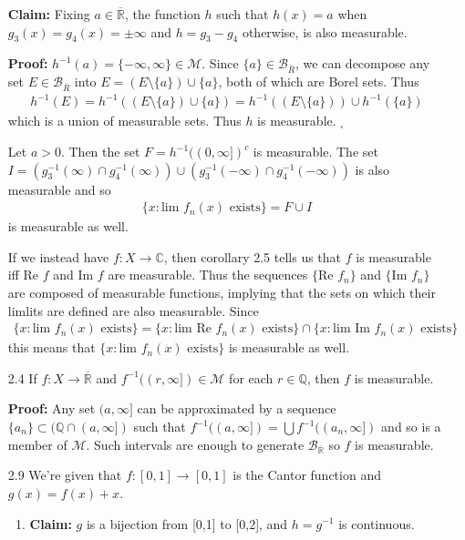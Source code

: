 \documentclass[11pt,letter]{article}
\begin{document}
\begin{enumerate}
    \textbf{Claim:} Fixing $a \in \overline{\mathbb{R}}$, the function $h$ such that $h(x) = a$ when $g_3(x) = g_4(x) = \pm \infty$ and $h = g_3 - g_4$ otherwise, is also measurable. 

    \textbf{Proof:} $h^{-1}(a) = \{-\infty, \infty\} \in \mathcal{M}$. Since $\{a\} \in \mathcal{B}_{\overline{R}}$, we can decompose any set $E \in \mathcal{B}_{\overline{R}}$ into $E = (E \setminus \{a\}) \cup \{a\}$, both of which are Borel sets. Thus
    \begin{align*}
        h^{-1}(E) = h^{-1}((E \setminus \{a\}) \cup \{a\}) = h^{-1}((E \setminus \{a\})) \cup h^{-1}(\{a\})
    \end{align*}
    which is a union of measurable sets. Thus $h$ is measurable. $_\square$

    Let $a > 0$. Then the set $F = h^{-1}((0,\infty])^c$ is measurable. The set $I = (g_3^{-1}(\infty) \cap g_4^{-1}(\infty)) \cup (g_3^{-1}(-\infty) \cap g_4^{-1}(-\infty))$ is also measurable and so
    \begin{align*}
        \{x: \text{lim }f_n(x) \text{ exists}\} = F \cup I
    \end{align*}
    is measurable as well.

    If we instead have $f: X \rightarrow \mathbb{C}$, then corollary 2.5 tells us that $f$ is measurable iff Re $f$ and Im $f$ are measurable. Thus the sequences $\{\text{Re }f_n\}$ and $\{\text{Im }f_n\}$ are composed of measurable functions, implying that the sets on which their limlits are defined are also measurable. Since
    \begin{align*}
        \{x: \text{lim }f_n(x) \text{ exists}\} = \{x: \text{lim Re }f_n(x) \text{ exists}\} \cap \{x: \text{lim Im }f_n(x) \text{ exists}\}
    \end{align*}
    this means that $\{x: \text{lim }f_n(x) \text{ exists}\}$ is measurable as well.

    \item[2.4] If $f:X \rightarrow \overline{\mathbb{R}}$ and $f^{-1}((r,\infty]) \in \mathcal{M}$ for each $r \in \mathbb{Q}$, then $f$ is measurable.

    \textbf{Proof:} Any set $(a,\infty]$ can be approximated by a sequence $\{a_n\} \subset (\mathbb{Q} \cap (a,\infty])$ such that $f^{-1}((a,\infty]) = \bigcup f^{-1}((a_n,\infty])$ and so is a member of $\mathcal{M}$. Such intervals are enough to generate $\mathcal{B}_{\overline{\mathbb{R}}}$ so $f$ is measurable. 

    \item[2.9] We're given that $f:[0,1] \rightarrow [0,1]$ is the Cantor function and $g(x) = f(x) + x$.
    \begin{enumerate}
        \item \textbf{Claim:} $g$ is a bijection from [0,1] to [0,2], and $h = g^{-1}$ is continuous.
        

\end{enumerate}
\end{enumerate}
\end{document}
